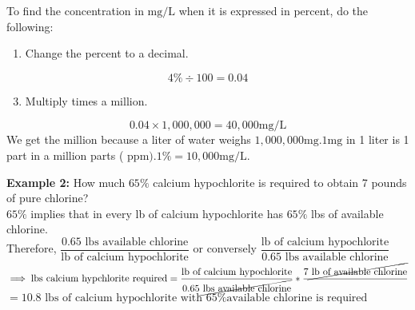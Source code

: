 \documentclass{article}
\begin{document}
To find the concentration in $\mathrm{mg} / \mathrm{L}$ when it is expressed in percent, do the following:

\begin{enumerate}
  \item Change the percent to a decimal.
\end{enumerate}
$$
4 \% \div 100=0.04
$$

\begin{enumerate}
  \setcounter{enumi}{2}
  \item Multiply times a million.
\end{enumerate}
$$
0.04 \times 1,000,000=40,000 \mathrm{mg} / \mathrm{L}
$$
We get the million because a liter of water weighs $1,000,000 \mathrm{mg} .1 \mathrm{mg}$ in 1 liter is 1 part in a million parts ( $\mathrm{ppm}) .1 \%=10,000 \mathrm{mg} / \mathrm{L}$.


\textbf{Example 2:} How much $65 \%$ calcium hypochlorite is required to obtain 7 pounds of pure chlorine?\\
$65 \%$ implies that in every lb of calcium hypochlorite has $65 \%$ lbs of available chlorine.\\
\vspace{0.2cm}
Therefore, $\dfrac{0.65 \textrm{ lbs available chlorine}}{\textrm{lb of calcium hypochlorite}} $ or conversely $\dfrac{\textrm{lb of calcium hypochlorite}}{0.65 \textrm{ lbs available chlorine}}$\\
\vspace{0.2cm}
$\implies{\textrm{lbs calcium hypchlorite required}}=\dfrac{\textrm{lb of calcium hypochlorite}}{0.65 \cancel{\textrm{ lbs available chlorine}}}*\dfrac{7\cancel{\textrm{ lb of available chlorine}}}{}$\\
\vspace{0.2cm}
$=\boxed{10.8 \textrm{ lbs of calcium hypochlorite with } 65\%\textrm{available chlorine is required}}$
\end{document}
